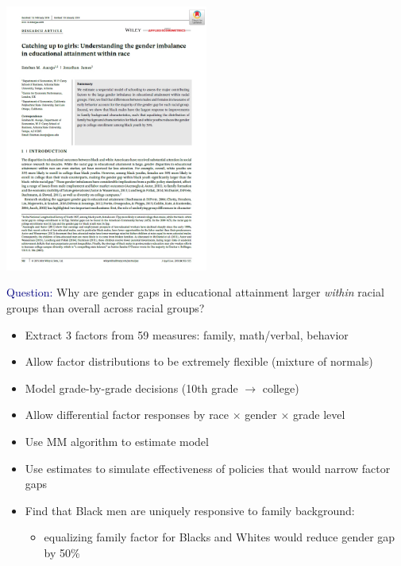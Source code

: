 \documentclass[aspectratio=169]{beamer}
\begin{document}
\begin{frame}
\centering
\includegraphics[width=0.5\textwidth]{Aucejo_James_2019_JAE_cover.jpg}
\end{frame}

\begin{frame}
\textcolor{navy}{Question:} Why are gender gaps in educational attainment larger \textit{within} racial groups than overall across racial groups?
\bigskip

\begin{itemize}
\itemsep1.5em
\item<2-> Extract 3 factors from 59 measures: family, math/verbal, behavior
\item<3-> Allow factor distributions to be extremely flexible (mixture of normals)
\item<4-> Model grade-by-grade decisions (10th grade $\to$ college)
\item<5-> Allow differential factor responses by race $\times$ gender $\times$ grade level
\end{itemize}
\end{frame}

\begin{frame}
\begin{itemize}
\itemsep1.5em
\item<1-> Use MM algorithm to estimate model
\item<2-> Use estimates to simulate effectiveness of policies that would narrow factor gaps
\item<3-> Find that Black men are uniquely responsive to family background: 
\bigskip\par
\begin{itemize}
    \item equalizing family factor for Blacks and Whites would reduce gender gap by 50\%
\end{itemize}

\end{itemize}
\end{frame}
\end{document}
